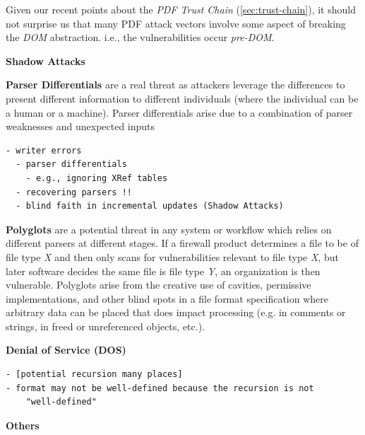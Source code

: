 Given our recent points about the \emph{PDF Trust Chain}
(\cref{sec:trust-chain}),
it should not surprise us that many PDF attack vectors
involve some aspect of breaking the \emph{DOM} abstraction.
i.e., the vulnerabilities occur \emph{pre-DOM}.

{\bf{Shadow Attacks}} 

{\bf{Parser Differentials}} are a real threat as attackers leverage the differences to present different information to different individuals (where the individual can be a human or a machine). Parser differentials arise due to a combination of parser weaknesses and unexpected inputs
\begin{lstlisting}[style=meta]
  - writer errors
  - parser differentials
    - e.g., ignoring XRef tables
  - recovering parsers !!
  - blind faith in incremental updates (Shadow Attacks)
\end{lstlisting}

{\bf{Polyglots}} are a potential threat in any system or workflow which relies on different parsers
at different stages. If a firewall product determines a file to be of file type \emph{X} and then only 
scans for vulnerabilities relevant to file type \emph{X}, but later software decides the same file 
is file type \emph{Y}, an organization is then vulnerable. Polyglots arise from the creative use of
cavities, permissive implementations, 
and other blind spots in a file format specification where arbitrary data can be placed 
that does impact processing (e.g. in comments or strings, in freed or unreferenced objects, etc.).

{\bf{Denial of Service (DOS)}} 
%
\begin{lstlisting}[style=meta]
- [potential recursion many places]
- format may not be well-defined because the recursion is not
    "well-defined"
\end{lstlisting}

{\bf{Others}} 

